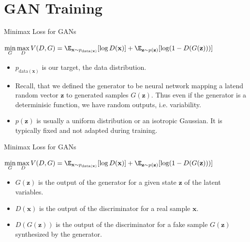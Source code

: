\section{GAN Training}

\begin{frame} {Minimax Loss for GANs}
  \begin{tcolorbox}
  $\min \limits_G \max \limits_D V(D,G) = \E_{\mathbf{x}\sim p_{\text{data}(\mathbf{x})}}[\log D(\mathbf{x})] + \E_{\mathbf{z}\sim p(\mathbf{z})}[\log (1 - D(G(\mathbf{z})))]$
  \end{tcolorbox}
   \begin{itemize}
  \vspace{6mm}
      \item $p_{\text{data}(\mathbf{x})}$ is our target, the data distribution.
  \vspace{6mm}
  \item Recall, that we defined the generator to be neural network mapping a latend random vector $\mathbf{z}$ to generated samples $G(\mathbf{z})$. Thus even if the generator is a determinisic function, we have random outputs, i.e. variability. 
  \vspace{6mm}
      \item $p(\mathbf{z})$ is usually a uniform distribution or an isotropic Gaussian. It is typically fixed and not adapted during training.

   \end{itemize}
\end{frame}

\begin{frame} {Minimax Loss for GANs}
  \begin{tcolorbox}
    $\min \limits_G \max \limits_D V(D,G) = \E_{\mathbf{x}\sim p_{\text{data}(\mathbf{x})}}[\log D(\mathbf{x})] + \E_{\mathbf{z}\sim p(\mathbf{z})}[\log (1 - D(G(\mathbf{z})))]$
  \end{tcolorbox}
  \begin{itemize}
  \vspace{6mm}
    \item $G(\mathbf{z})$ is the output of the generator for a given state $\mathbf{z}$ of the latent variables.
  \vspace{6mm}
      \item $D(\mathbf{x})$ is the output of the discriminator for a real sample $\mathbf{x}$.
  \vspace{6mm}
      \item $D(G(\mathbf{z}))$ is the output of the discriminator for a fake sample $G(\mathbf{z})$ synthesized by the generator.
  \end{itemize}
\end{frame}


